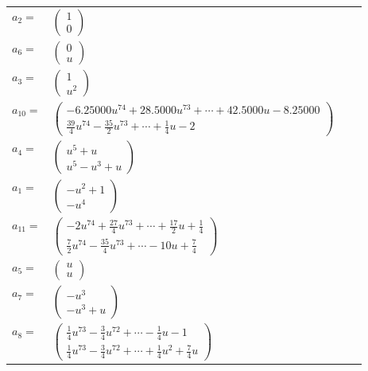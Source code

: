 \documentclass[1p]{elsarticle_modified}
\theoremstyle{definition}
\begin{document}
\begin{tabular}{m{7pt} m{180pt} m{7pt} m{180pt} }
\flushright $a_{2}=$&$\begin{pmatrix}1\\0\end{pmatrix}$ \\
\flushright $a_{6}=$&$\begin{pmatrix}0\\u\end{pmatrix}$ \\
\flushright $a_{3}=$&$\begin{pmatrix}1\\u^2\end{pmatrix}$ \\
\flushright $a_{10}=$&$\begin{pmatrix}-6.25000 u^{74}+28.5000 u^{73}+\cdots+42.5000 u-8.25000\\\frac{39}{4} u^{74}-\frac{35}{2} u^{73}+\cdots+\frac{1}{4} u-2\end{pmatrix}$ \\
\flushright $a_{4}=$&$\begin{pmatrix}u^5+u\\u^5- u^3+u\end{pmatrix}$ \\
\flushright $a_{1}=$&$\begin{pmatrix}- u^2+1\\- u^4\end{pmatrix}$ \\
\flushright $a_{11}=$&$\begin{pmatrix}-2 u^{74}+\frac{27}{4} u^{73}+\cdots+\frac{17}{2} u+\frac{1}{4}\\\frac{7}{2} u^{74}-\frac{35}{4} u^{73}+\cdots-10 u+\frac{7}{4}\end{pmatrix}$ \\
\flushright $a_{5}=$&$\begin{pmatrix}u\\u\end{pmatrix}$ \\
\flushright $a_{7}=$&$\begin{pmatrix}- u^3\\- u^3+u\end{pmatrix}$ \\
\flushright $a_{8}=$&$\begin{pmatrix}\frac{1}{4} u^{73}-\frac{3}{4} u^{72}+\cdots-\frac{1}{4} u-1\\\frac{1}{4} u^{73}-\frac{3}{4} u^{72}+\cdots+\frac{1}{4} u^2+\frac{7}{4} u\end{pmatrix}$ \\

\end{tabular}
\end{document}
